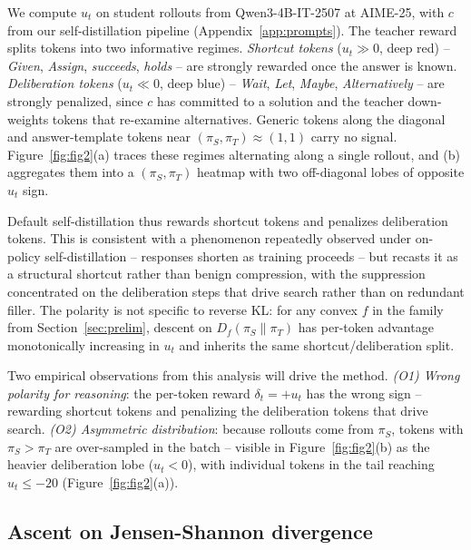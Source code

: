 \documentclass{article}
\begin{document}
We compute $u_t$ on student rollouts from Qwen3-4B-IT-2507 at AIME-25, with $c$ from our self-distillation pipeline (Appendix~\ref{app:prompts}). The teacher reward splits tokens into two informative regimes. \emph{Shortcut tokens} ($u_t \gg 0$, deep red) -- \emph{Given}, \emph{Assign}, \emph{succeeds}, \emph{holds} -- are strongly rewarded once the answer is known. \emph{Deliberation tokens} ($u_t \ll 0$, deep blue) -- \emph{Wait}, \emph{Let}, \emph{Maybe}, \emph{Alternatively} -- are strongly penalized, since $c$ has committed to a solution and the teacher down-weights tokens that re-examine alternatives. Generic tokens along the diagonal and answer-template tokens near $(\pi_S, \pi_T) \approx (1,1)$ carry no signal. Figure~\ref{fig:fig2}(a) traces these regimes alternating along a single rollout, and (b) aggregates them into a $(\pi_S, \pi_T)$ heatmap with two off-diagonal lobes of opposite $u_t$ sign.

Default self-distillation thus rewards shortcut tokens and penalizes deliberation tokens. This is consistent with a phenomenon repeatedly observed under on-policy self-distillation -- responses shorten as training proceeds \citep{sdpo,kim2026does,opsdc} -- but recasts it as a structural shortcut rather than benign compression, with the suppression concentrated on the deliberation steps that drive search rather than on redundant filler. The polarity is not specific to reverse KL: for any convex $f$ in the family from Section~\ref{sec:prelim}, descent on $D_f(\pi_S \| \pi_T)$ has per-token advantage monotonically increasing in $u_t$ and inherits the same shortcut/deliberation split.

Two empirical observations from this analysis will drive the method. \emph{(O1) Wrong polarity for reasoning}: the per-token reward $\delta_t = +u_t$ has the wrong sign -- rewarding shortcut tokens and penalizing the deliberation tokens that drive search. \emph{(O2) Asymmetric distribution}: because rollouts come from $\pi_S$, tokens with $\pi_S > \pi_T$ are over-sampled in the batch -- visible in Figure~\ref{fig:fig2}(b) as the heavier deliberation lobe ($u_t < 0$), with individual tokens in the tail reaching $u_t \le -20$ (Figure~\ref{fig:fig2}(a)).



\subsection{Ascent on Jensen-Shannon divergence}
\label{sec:antisd:stab}
\vspace{-0.5em}
\end{document}
